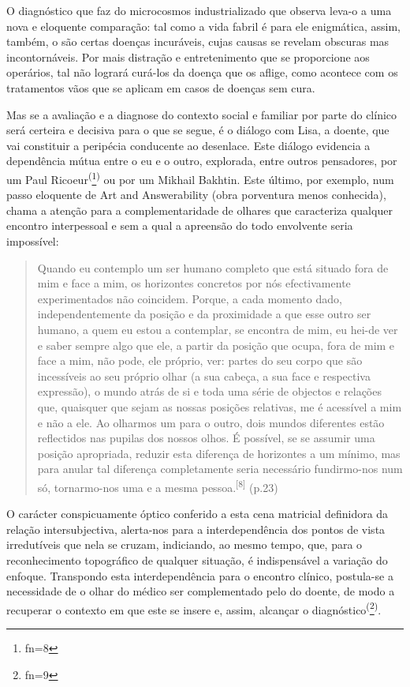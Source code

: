 \documentclass{article}
\makeatletter
\newcommand{\fn}{\afterassignment\fn@aux\count0=}
\newcommand{\fn@aux}{\csname fn\the\count0\endcsname}
\makeatother
\begin{document}
O diagnóstico que faz do microcosmos industrializado que observa leva-o a uma
nova e eloquente comparação: tal como a vida fabril é para ele enigmática,
assim, também, o são certas doenças incuráveis, cujas causas se revelam obscuras
mas incontornáveis. Por mais distração e entretenimento que se proporcione aos
operários, tal não logrará curá-los da doença que os aflige, como acontece com
os tratamentos vãos que se aplicam em casos de doenças sem cura.

Mas se a avaliação e a diagnose do contexto social e familiar por parte do
clínico será certeira e decisiva para o que se segue, é o diálogo com Lisa, a
doente, que vai constituir a peripécia conducente ao desenlace. Este diálogo
evidencia a dependência mútua entre o eu e o outro, explorada, entre outros
pensadores, por um Paul Ricoeur\textsuperscript{(}\footnote{\fn8}\textsuperscript{)}
ou por um Mikhail Bakhtin. Este último, por exemplo, num passo eloquente de Art
and Answerability (obra porventura menos conhecida), chama a atenção para a
complementaridade de olhares que caracteriza qualquer encontro interpessoal e
sem a qual a apreensão do todo envolvente seria impossível:
\begin{quote}

Quando eu contemplo um ser humano completo que está situado fora de mim e face a
mim, os horizontes concretos por nós efectivamente experimentados não coincidem.
Porque, a cada momento dado, independentemente da posição e da proximidade a que
esse outro ser humano, a quem eu estou a contemplar, se encontra de mim, eu
hei-de ver e saber sempre algo que ele, a partir da posição que ocupa, fora de
mim e face a mim, não pode, ele próprio, ver: partes do seu corpo que são
incessíveis ao seu próprio olhar (a sua cabeça, a sua face e respectiva
expressão), o mundo atrás de si e toda uma série de objectos e relações que,
quaisquer que sejam as nossas posições relativas, me é acessível a mim e não a
ele. Ao olharmos um para o outro, dois mundos diferentes estão reflectidos nas
pupilas dos nossos olhos. É possível, se se assumir uma posição apropriada,
reduzir esta diferença de horizontes a um mínimo, mas para anular tal diferença
completamente seria necessário fundirmo-nos num só, tornarmo-nos uma e a mesma
pessoa.\textsuperscript{[}\textsuperscript{8}\textsuperscript{]}
(p.23)

\end{quote}

O carácter conspicuamente óptico conferido a esta cena matricial definidora da
relação intersubjectiva, alerta-nos para a interdependência dos pontos de vista
irredutíveis que nela se cruzam, indiciando, ao mesmo tempo, que, para o
reconhecimento topográfico de qualquer situação, é indispensável a variação do
enfoque. Transpondo esta interdependência para o encontro clínico, postula-se a
necessidade de o olhar do médico ser complementado pelo do doente, de modo a
recuperar o contexto em que este se insere e, assim, alcançar o
diagnóstico\textsuperscript{(}\footnote{\fn9}\textsuperscript{)}.
\end{document}
